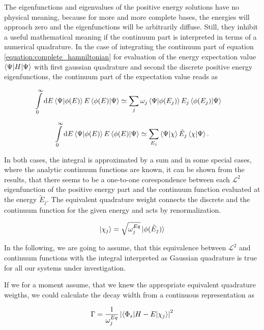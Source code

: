 The eigenfunctions and eigenvalues of the positive energy solutions have no physical
meaning, because for more and more complete bases, the energies will approach zero
and the eigenfunctions will be arbitrarily diffuse. Still, they inhibit a useful
mathematical meaning if the continuum part is interpreted in terms of
a numerical quadrature.
In the case of integrating the continuum part of equation
\ref{equation:complete_hamniltonian} for evaluation of the energy expectation
value $\braket{\Psi| H | \Psi}$
with first gaussian quadrature and second the discrete positive energy
eigenfunctions, the continuum part of the expectation value reads as


\begin{align}
  \int\limits_0^\infty \mathrm{d}E \braket{\Psi|\phi(E)} E \braket{\phi(E)|\Psi}
  &\simeq \sum\limits_j \omega_j \braket{\Psi|\phi(E_j)} E_j \braket{\phi(E_j)|\Psi}
\end{align}



\begin{equation}
  \int\limits_0^\infty \mathrm{d}E \braket{\Psi|\phi(E)} E \braket{\phi(E)|\Psi}
  \simeq \sum\limits_{E_j}  \braket{\Psi|\chi} \tilde{E}_j \braket{\chi|\Psi}   .
\end{equation}

In both cases, the integral is approximated by a sum and in some special cases, where
the analytic continuum functions are known, it can be shown from the results,
that there seems to be a one-to-one corespondence between each $\mathcal{L}^2$
eigenfunction of the positive energy part and the continuum function evaluated
at the energy $\tilde{E}_j$. The equivalent quadrature weight connects the discrete and
the continuum function for the given energy and acts by renormalization.

\begin{equation}
  \ket{\chi_j} = \sqrt{\omega_j^{Eq}} \ket{\phi(\tilde{E}_j)}
\end{equation}

In the following, we are going to assume, that this equivalence between $\mathcal{L}^2$
and continuum functions with the integral interpreted as Gaussian quadrature
is true for all our systems under investigation.

If we for a moment assume, that we knew the appropriate equivalent quadrature
weigths, we could calculate the decay width from a continuous representation as

\begin{equation}
  \Gamma = \frac 1{\omega_{j}^{Eq}} \left| \braket{\Phi_s|H-E|\chi_j} \right|^2
\end{equation}


